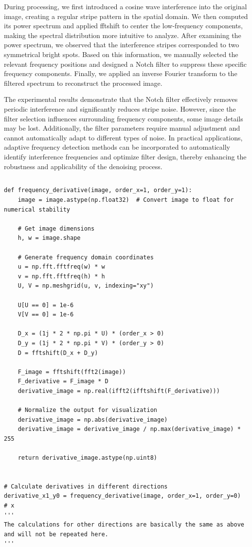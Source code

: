 \documentclass[12pt]{article}
\begin{document}
During processing, we first introduced a cosine wave interference into the original image, creating a regular stripe pattern in the spatial domain. We then computed its power spectrum and applied fftshift to center the low-frequency components, making the spectral distribution more intuitive to analyze. After examining the power spectrum, we observed that the interference stripes corresponded to two symmetrical bright spots. Based on this information, we manually selected the relevant frequency positions and designed a Notch filter to suppress these specific frequency components. Finally, we applied an inverse Fourier transform to the filtered spectrum to reconstruct the processed image.

The experimental results demonstrate that the Notch filter effectively removes periodic interference and significantly reduces stripe noise. However, since the filter selection influences surrounding frequency components, some image details may be lost. Additionally, the filter parameters require manual adjustment and cannot automatically adapt to different types of noise. In practical applications, adaptive frequency detection methods can be incorporated to automatically identify interference frequencies and optimize filter design, thereby enhancing the robustness and applicability of the denoising process.

\subsection{}

\begin{lstlisting}[caption={Compute Spatial Derivatives},captionpos=b]
def frequency_derivative(image, order_x=1, order_y=1):
    image = image.astype(np.float32)  # Convert image to float for numerical stability

    # Get image dimensions
    h, w = image.shape

    # Generate frequency domain coordinates
    u = np.fft.fftfreq(w) * w
    v = np.fft.fftfreq(h) * h
    U, V = np.meshgrid(u, v, indexing="xy")

    U[U == 0] = 1e-6
    V[V == 0] = 1e-6

    D_x = (1j * 2 * np.pi * U) * (order_x > 0)
    D_y = (1j * 2 * np.pi * V) * (order_y > 0)
    D = fftshift(D_x + D_y)

    F_image = fftshift(fft2(image))
    F_derivative = F_image * D
    derivative_image = np.real(ifft2(ifftshift(F_derivative)))

    # Normalize the output for visualization
    derivative_image = np.abs(derivative_image)
    derivative_image = derivative_image / np.max(derivative_image) * 255

    return derivative_image.astype(np.uint8)


# Calculate derivatives in different directions
derivative_x1_y0 = frequency_derivative(image, order_x=1, order_y=0)  # x
'''
The calculations for other directions are basically the same as above and will not be repeated here.
'''
\end{lstlisting}
\end{document}
